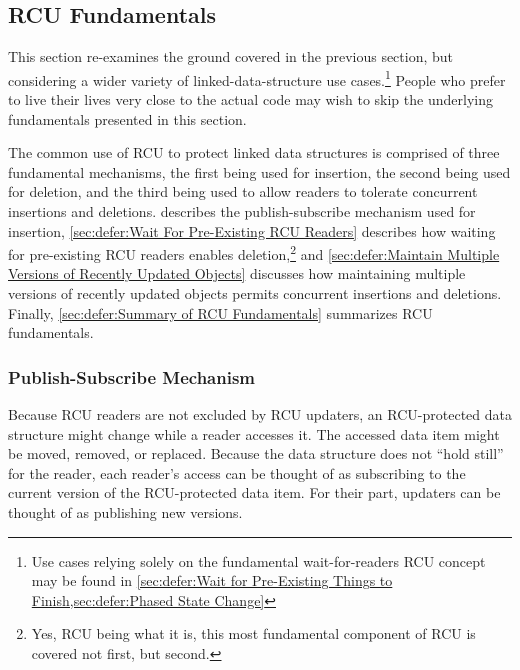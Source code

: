 
\subsection{RCU Fundamentals}
\label{sec:defer:RCU Fundamentals}

This section re-examines the ground covered in the previous section, but
considering a wider variety of linked-data-structure use cases.\footnote{
	Use cases relying solely on the fundamental wait-for-readers
	RCU concept may be found in
	\cref{sec:defer:Wait for Pre-Existing Things to Finish,sec:defer:Phased State Change}}
People who prefer to live their lives very close to the actual code may
wish to skip the underlying fundamentals presented in this section.

The common use of RCU to protect linked data structures is comprised
of three fundamental mechanisms, the first being used for insertion,
the second being used for deletion, and the third being used to allow
readers to tolerate concurrent insertions and deletions.
describes the publish-subscribe mechanism used for insertion,
\cref{sec:defer:Wait For Pre-Existing RCU Readers}
describes how waiting for pre-existing RCU readers enables
deletion,\footnote{
	Yes, RCU being what it is, this most fundamental component of
	RCU is covered not first, but second.}
and
\cref{sec:defer:Maintain Multiple Versions of Recently Updated Objects}
discusses how maintaining multiple versions of recently updated objects
permits concurrent insertions and deletions.
Finally,
\cref{sec:defer:Summary of RCU Fundamentals}
summarizes RCU fundamentals.

\subsubsection{Publish-Subscribe Mechanism}
\label{sec:defer:Publish-Subscribe Mechanism}

Because RCU readers are not excluded by RCU updaters, an RCU-protected
data structure might change while a reader accesses it.
The accessed data item might be moved, removed, or replaced.
Because the data structure does not ``hold still'' for the reader,
each reader's access can be thought of as subscribing to the current
version of the RCU-protected data item.
For their part, updaters can be thought of as publishing new versions.

